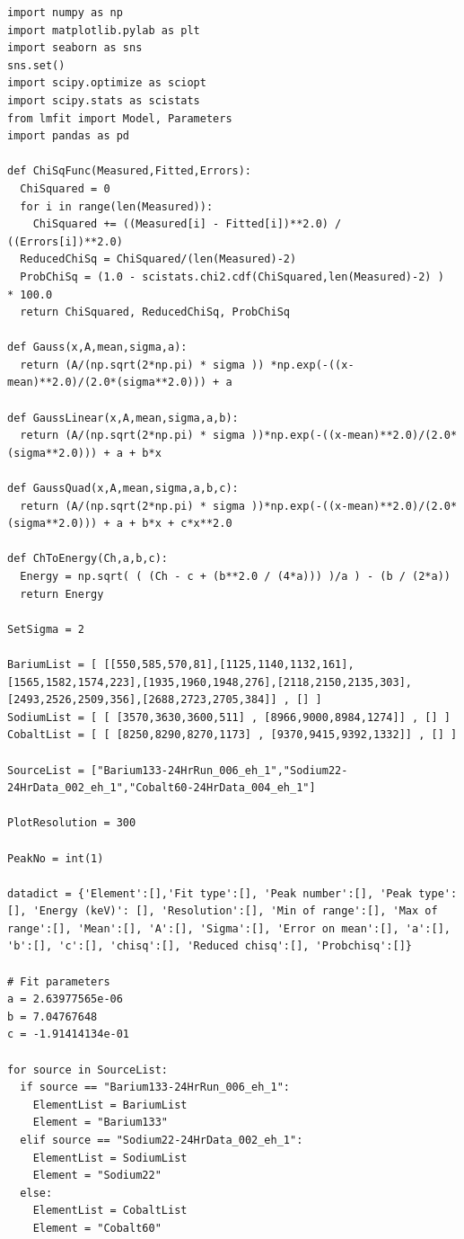 \documentclass[11pt,a4paper]{article}
\begin{document}
\begin{verbatim}
import numpy as np
import matplotlib.pylab as plt
import seaborn as sns
sns.set()
import scipy.optimize as sciopt
import scipy.stats as scistats
from lmfit import Model, Parameters
import pandas as pd

def ChiSqFunc(Measured,Fitted,Errors):
  ChiSquared = 0
  for i in range(len(Measured)):
    ChiSquared += ((Measured[i] - Fitted[i])**2.0) / ((Errors[i])**2.0)
  ReducedChiSq = ChiSquared/(len(Measured)-2)
  ProbChiSq = (1.0 - scistats.chi2.cdf(ChiSquared,len(Measured)-2) )  * 100.0
  return ChiSquared, ReducedChiSq, ProbChiSq

def Gauss(x,A,mean,sigma,a):
  return (A/(np.sqrt(2*np.pi) * sigma )) *np.exp(-((x-mean)**2.0)/(2.0*(sigma**2.0))) + a

def GaussLinear(x,A,mean,sigma,a,b):
  return (A/(np.sqrt(2*np.pi) * sigma ))*np.exp(-((x-mean)**2.0)/(2.0*(sigma**2.0))) + a + b*x

def GaussQuad(x,A,mean,sigma,a,b,c):
  return (A/(np.sqrt(2*np.pi) * sigma ))*np.exp(-((x-mean)**2.0)/(2.0*(sigma**2.0))) + a + b*x + c*x**2.0    

def ChToEnergy(Ch,a,b,c):
  Energy = np.sqrt( ( (Ch - c + (b**2.0 / (4*a))) )/a ) - (b / (2*a))
  return Energy

SetSigma = 2

BariumList = [ [[550,585,570,81],[1125,1140,1132,161],[1565,1582,1574,223],[1935,1960,1948,276],[2118,2150,2135,303],[2493,2526,2509,356],[2688,2723,2705,384]] , [] ]
SodiumList = [ [ [3570,3630,3600,511] , [8966,9000,8984,1274]] , [] ]
CobaltList = [ [ [8250,8290,8270,1173] , [9370,9415,9392,1332]] , [] ]

SourceList = ["Barium133-24HrRun_006_eh_1","Sodium22-24HrData_002_eh_1","Cobalt60-24HrData_004_eh_1"]

PlotResolution = 300

PeakNo = int(1)

datadict = {'Element':[],'Fit type':[], 'Peak number':[], 'Peak type':[], 'Energy (keV)': [], 'Resolution':[], 'Min of range':[], 'Max of range':[], 'Mean':[], 'A':[], 'Sigma':[], 'Error on mean':[], 'a':[], 'b':[], 'c':[], 'chisq':[], 'Reduced chisq':[], 'Probchisq':[]}

# Fit parameters
a = 2.63977565e-06
b = 7.04767648
c = -1.91414134e-01

for source in SourceList:
  if source == "Barium133-24HrRun_006_eh_1":
    ElementList = BariumList
    Element = "Barium133"
  elif source == "Sodium22-24HrData_002_eh_1":
    ElementList = SodiumList
    Element = "Sodium22"
  else:
    ElementList = CobaltList
    Element = "Cobalt60"


\end{verbatim}
\end{document}

